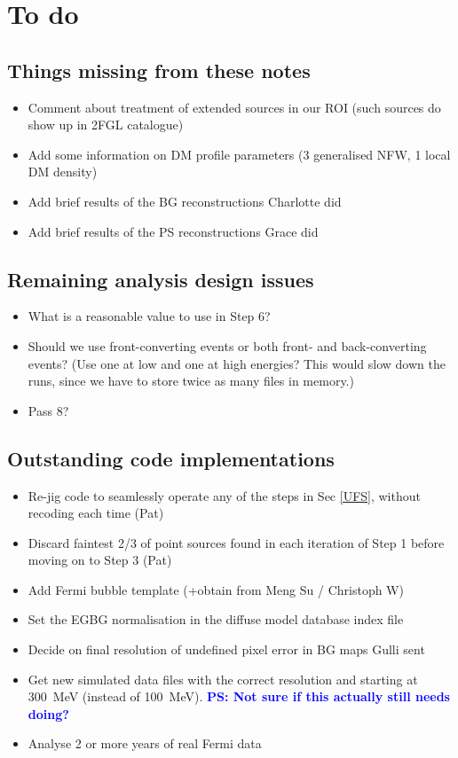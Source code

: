 \documentclass{article}
\newcommand{\ps}[1]{\textcolor{blue}{{\bf PS: #1}}}
\begin{document}
\section{To do}

\subsection{Things missing from these notes}
\begin{itemize}
\item Comment about treatment of extended sources in our ROI (such sources do show up in 2FGL catalogue)
\item Add some information on DM profile parameters (3 generalised NFW, 1 local DM density)  
\item Add brief results of the BG reconstructions Charlotte did
\item Add brief results of the PS reconstructions Grace did
\end{itemize}

\subsection{Remaining analysis design issues}
\begin{itemize}
\item What is a reasonable value to use in Step 6?
\item Should we use front-converting events or both front- and back-converting events? (Use one at low and one at high energies?  This would slow down the runs, since we have to store twice as many files in memory.)
\item Pass 8?
\end{itemize}

\subsection{Outstanding code implementations}
\begin{itemize}
\item Re-jig code to seamlessly operate any of the steps in Sec \ref{UFS}, without recoding each time (Pat)
\item Discard faintest 2/3 of point sources found in each iteration of Step 1 before moving on to Step 3 (Pat)
\item Add Fermi bubble template (+obtain from Meng Su / Christoph W)
\item Set the EGBG normalisation in the diffuse model database index file
\item Decide on final resolution of undefined pixel error in BG maps Gulli sent
\item Get new simulated data files with the correct resolution and starting at 300\ MeV (instead of 100\ MeV). \ps{Not sure if this actually still needs doing?}
\item Analyse 2 or more years of real Fermi data
\end{itemize}
\end{document}
